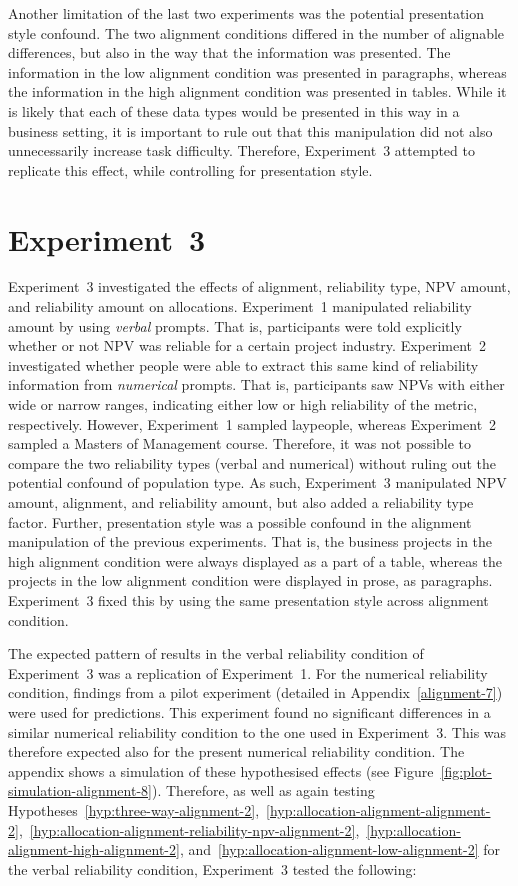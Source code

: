 \documentclass[a4paper, nobind, dvipsnames]{templates/ociamthesis}
\theoremstyle{definition}
\theoremstyle{definition}
\theoremstyle{definition}
\theoremstyle{definition}
\theoremstyle{remark}
\begin{document}
Another limitation of the last two experiments was the potential presentation
style confound. The two alignment conditions differed in the number of alignable
differences, but also in the way that the information was presented. The
information in the low alignment condition was presented in paragraphs, whereas
the information in the high alignment condition was presented in tables. While
it is likely that each of these data types would be presented in this way in a
business setting, it is important to rule out that this manipulation did not
also unnecessarily increase task difficulty. Therefore, Experiment~3 attempted
to replicate this effect, while controlling for presentation style.

\hypertarget{alignment-8}{%
\section{Experiment~3}\label{alignment-8}}

Experiment~3 investigated the effects of alignment, reliability type, NPV
amount, and reliability amount on allocations. Experiment~1 manipulated
reliability amount by using \emph{verbal} prompts. That is, participants were told
explicitly whether or not NPV was reliable for a certain project industry.
Experiment~2 investigated whether people were able to extract this same kind of
reliability information from \emph{numerical} prompts. That is, participants saw NPVs
with either wide or narrow ranges, indicating either low or high reliability of
the metric, respectively. However, Experiment~1 sampled laypeople, whereas
Experiment~2 sampled a Masters of Management course. Therefore, it was not
possible to compare the two reliability types (verbal and numerical) without
ruling out the potential confound of population type. As such, Experiment~3
manipulated NPV amount, alignment, and reliability amount, but also added a
reliability type factor. Further, presentation style was a possible confound in
the alignment manipulation of the previous experiments. That is, the business
projects in the high alignment condition were always displayed as a part of a
table, whereas the projects in the low alignment condition were displayed in
prose, as paragraphs. Experiment~3 fixed this by using the same presentation
style across alignment condition.

The expected pattern of results in the verbal reliability condition of
Experiment~3 was a replication of Experiment~1. For the numerical reliability
condition, findings from a pilot experiment (detailed in
Appendix~\ref{alignment-7}) were used for predictions. This experiment found no
significant differences in a similar numerical reliability condition to the one
used in Experiment~3. This was therefore expected also for the present numerical
reliability condition. The appendix shows a simulation of these hypothesised
effects (see Figure~\ref{fig:plot-simulation-alignment-8}). Therefore, as well
as again testing
Hypotheses~\ref{hyp:three-way-alignment-2},~\ref{hyp:allocation-alignment-alignment-2},~\ref{hyp:allocation-alignment-reliability-npv-alignment-2},~\ref{hyp:allocation-alignment-high-alignment-2},
and~\ref{hyp:allocation-alignment-low-alignment-2} for the verbal reliability
condition, Experiment~3 tested the following:
\end{document}
